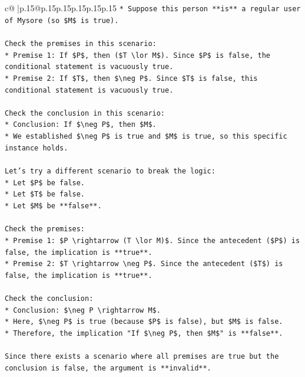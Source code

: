 \documentclass{article}
\begin{document}
{\begin{supertabular}{c@{$\;$}|p{.15\linewidth}@{}p{.15\linewidth}p{.15\linewidth}p{.15\linewidth}p{.15\linewidth}p{.15\linewidth}}
{{{\texttt{*   Suppose this person **is** a regular user of Mysore (so \$M\$ is true).} \\
\\ 
\texttt{Check the premises in this scenario:} \\
\texttt{*   Premise 1: If \$P\$, then (\$T \textbackslash{}lor M\$). Since \$P\$ is false, the conditional statement is vacuously true.} \\
\texttt{*   Premise 2: If \$T\$, then \$\textbackslash{}neg P\$. Since \$T\$ is false, this conditional statement is vacuously true.} \\
\\ 
\texttt{Check the conclusion in this scenario:} \\
\texttt{*   Conclusion: If \$\textbackslash{}neg P\$, then \$M\$.} \\
\texttt{*   We established \$\textbackslash{}neg P\$ is true and \$M\$ is true, so this specific instance holds.} \\
\\ 
\texttt{Let's try a different scenario to break the logic:} \\
\texttt{*   Let \$P\$ be false.} \\
\texttt{*   Let \$T\$ be false.} \\
\texttt{*   Let \$M\$ be **false**.} \\
\\ 
\texttt{Check the premises:} \\
\texttt{*   Premise 1: \$P \textbackslash{}rightarrow (T \textbackslash{}lor M)\$. Since the antecedent (\$P\$) is false, the implication is **true**.} \\
\texttt{*   Premise 2: \$T \textbackslash{}rightarrow \textbackslash{}neg P\$. Since the antecedent (\$T\$) is false, the implication is **true**.} \\
\\ 
\texttt{Check the conclusion:} \\
\texttt{*   Conclusion: \$\textbackslash{}neg P \textbackslash{}rightarrow M\$.} \\
\texttt{*   Here, \$\textbackslash{}neg P\$ is true (because \$P\$ is false), but \$M\$ is false.} \\
\texttt{*   Therefore, the implication "If \$\textbackslash{}neg P\$, then \$M\$" is **false**.} \\
\\ 
\texttt{Since there exists a scenario where all premises are true but the conclusion is false, the argument is **invalid**.} \\
}}}
\end{supertabular}}
\end{document}
